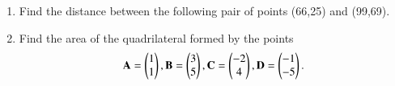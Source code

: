 \renewcommand{\theequation}{\theenumi}
\renewcommand{\thefigure}{\theenumi}
\begin{enumerate}[label=\thesubsection.\arabic*.,ref=\thesubsection.\theenumi]

\item Find the distance between the following pair of points
(66,25) and (99,69).
\\

%
\item Find the area of the quadrilateral formed by the points
\begin{align}
\begin{split}
\mathbf{A} = \begin{pmatrix}1 \\ 1\end{pmatrix}, 
\mathbf{B} = \begin{pmatrix}3 \\ 5\end{pmatrix}, 
\mathbf{C} = \begin{pmatrix}-2 \\ 4\end{pmatrix}, 
\mathbf{D} = \begin{pmatrix}-1 \\ -5\end{pmatrix}.
\end{split}
\end{align}
\solution

\end{enumerate}
